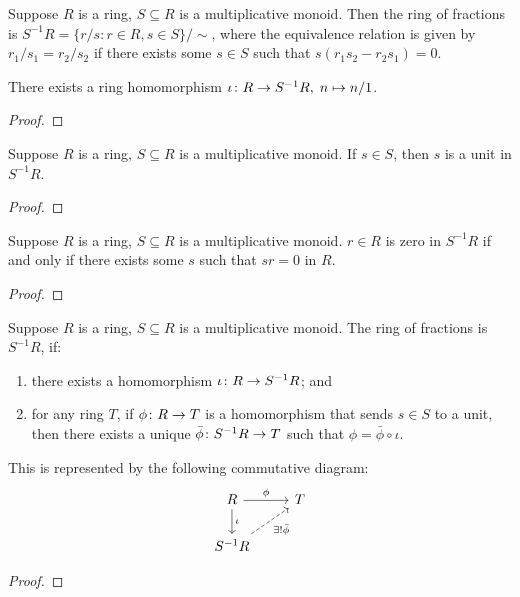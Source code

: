 \begin{definition}
    Suppose \(R\) is a ring, \(S \subseteq R\) is a multiplicative monoid.
    Then the ring of fractions is \(S^{-1}R = \{r/s : r \in R, s \in S\}/{\sim}\),
    where the equivalence relation is given by \(r_1/s_1 = r_2/s_2\)
    if there exists some \(s \in S\) such that \(s(r_1s_2 - r_2s_1) = 0\).
\end{definition}
\begin{proposition}
    There exists a ring homomorphism \(\iota\colon R\to S^{-1}R,\;n\mapsto n/1\).
\end{proposition}
\begin{proof}
    
\end{proof}
\begin{lemma}
    Suppose \(R\) is a ring, \(S \subseteq R\) is a multiplicative monoid.
    If \(s \in S\), then \(s\) is a unit in \(S^{-1}R\).
\end{lemma}
\begin{proof}
    
\end{proof}
\begin{lemma}
    Suppose \(R\) is a ring, \(S \subseteq R\) is a multiplicative monoid.
    \(r \in R\) is zero in \(S^{-1}R\) if and only if there exists some \(s\)
    such that \(sr = 0\) in \(R\).
\end{lemma}
\begin{proof}
    
\end{proof}

\begin{theorem}
    Suppose \(R\) is a ring, \(S \subseteq R\) is a multiplicative monoid.
    The ring of fractions is \(S^{-1}R\), if:
    \begin{enumerate}
        \item there exists a homomorphism \(\iota\colon R\to S^{-1}R\); and
        \item for any ring \(T\), if \(\phi\colon R\to T\) is a homomorphism that sends \(s \in S\) to a unit,
            then there exists a unique \(\bar{\phi}\colon S^{-1}R\to T\)
            such that \(\phi = \bar{\phi}\circ\iota\).
    \end{enumerate}
    
    This is represented by the following commutative diagram:
    \begin{equation*}
        \begin{tikzcd}
            R \arrow{r}{\phi} \arrow{d}{\iota} & T \\
            S^{-1}R \arrow[dashrightarrow]{ur}[swap]{\exists!\bar{\phi}}
        \end{tikzcd}
    \end{equation*}
\end{theorem}
\begin{proof}
    
\end{proof}

